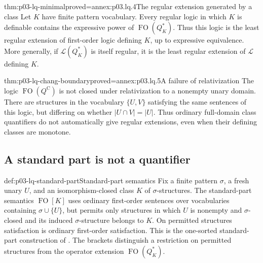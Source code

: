 \begin{hbcorollary}{thm:p03-lq-minimal}{proved=annex:p03.lq.4}{The regular extension generated by a class}
Let \(K\) have finite pattern vocabulary. Every regular logic in
which \(K\) is definable contains the expressive power of
\(\operatorname{FO}(Q_K^*)\). Thus this logic is the least regular
extension of first-order logic defining \(K\), up to expressive
equivalence. More generally, if \(\mathscr L(Q_K^*)\) is itself
regular, it is the least regular extension of \(\mathscr L\)
defining \(K\).
\end{hbcorollary}

\begin{hbtheorem}{thm:p03-lq-chang-boundary}{proved=annex:p03.lq.5}{A failure of relativization}
The logic \(\operatorname{FO}(Q^{\mathrm C})\) is not closed under
relativization to a nonempty unary domain. There are structures in the
vocabulary \(\{U,V\}\) satisfying the same sentences of this logic,
but differing on whether \(|U\cap V|=|U|\).
Thus ordinary full-domain class quantifiers do not automatically give
regular extensions, even when their defining classes are monotone.
\end{hbtheorem}

\subsection{A standard part is not a quantifier}

\begin{hbdefinition}{def:p03-lq-standard-part}{Standard-part semantics}
Fix a finite pattern \(\sigma\), a fresh unary \(U\), and an
isomorphism-closed class \(K\) of \(\sigma\)-structures.
The standard-part semantics \(\operatorname{FO}[K]\) uses ordinary
first-order sentences over vocabularies containing \(\sigma\cup\{U\}\),
but permits only structures in which \(U\) is nonempty and
\(\sigma\)-closed and its induced \(\sigma\)-structure belongs to \(K\).
On permitted structures satisfaction is ordinary first-order satisfaction.
This is the one-sorted standard-part construction of
\cite[Ch.~II, \S2.6, pp.~39--40]{Ebbinghaus1985ExtendedLogics}.
The brackets distinguish a restriction on permitted structures from
the operator extension \(\operatorname{FO}(Q_K^*)\).
\end{hbdefinition}

